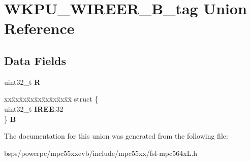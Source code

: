 \hypertarget{unionWKPU__WIREER__32B__tag}{}\section{W\+K\+P\+U\+\_\+\+W\+I\+R\+E\+E\+R\+\_\+B\+\_\+tag Union Reference}
\label{unionWKPU__WIREER__32B__tag}
\subsection*{Data Fields}
\begin{DoxyCompactItemize}
\item 
\mbox{\label{unionWKPU__WIREER__32B__tag_a763202a055c652f9a37953c4c44b9ca1}} 
uint32\+\_\+t {\bfseries R}
\item 
\mbox{\label{unionWKPU__WIREER__32B__tag_a2f2a2157882f4aee70ebe46a7f77da1d}} 
\begin{tabbing}
xx\=xx\=xx\=xx\=xx\=xx\=xx\=xx\=xx\=\kill
struct \{\\
\>uint32\_t {\bfseries IREE}:32\\
\} {\bfseries B}\\

\end{tabbing}\end{DoxyCompactItemize}


The documentation for this union was generated from the following file\+:\begin{DoxyCompactItemize}
\item 
bsps/powerpc/mpc55xxevb/include/mpc55xx/fsl-\/mpc564x\+L.\+h\end{DoxyCompactItemize}
